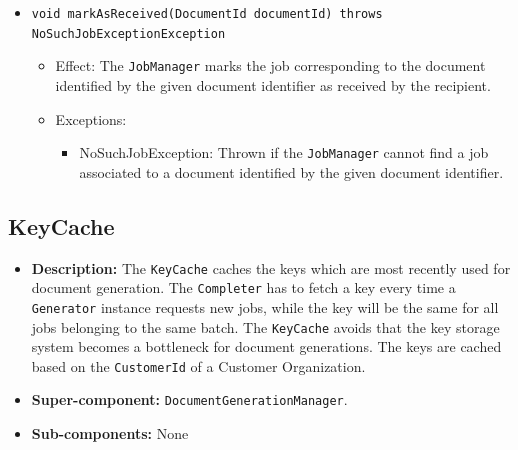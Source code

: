 \documentclass[a4paper,10pt]{article}
\begin{document}
\begin{itemize}
\begin{itemize}
    	\item \texttt{void markAsReceived(DocumentId documentId) throws NoSuchJobExceptionException}
    	\begin{itemize}
    		\item Effect: The \texttt{JobManager} marks the job corresponding to the document identified by the given document identifier as received by the recipient.
    		\item Exceptions:
    		\begin{itemize}
    			\item NoSuchJobException: Thrown if the \texttt{JobManager} cannot find a job associated to a document identified by the given document identifier.
    		\end{itemize}
    	\end{itemize}
    \end{itemize}     
\end{itemize}

\subsection{KeyCache}
\begin{itemize}
    \item \textbf{Description:} The \texttt{KeyCache} caches the keys which are most recently used for document generation. The \texttt{Completer} has to fetch a key every time a \texttt{Generator} instance requests new jobs, while the key will be the same for all jobs belonging to the same batch. The \texttt{KeyCache} avoids that the key storage system becomes a bottleneck for document generations. The keys are cached based on the \texttt{CustomerId} of a Customer Organization.
    \item \textbf{Super-component:}  \texttt{DocumentGenerationManager}.
    \item \textbf{Sub-components:} None
\end{itemize}
\end{document}
